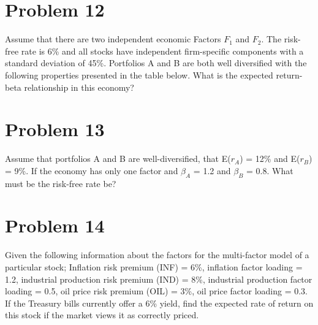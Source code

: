 \documentclass[12]{article}
\begin{document}
\color{black}
\section*{Problem 12}
Assume that there are two independent economic Factors $F_1$ and $F_2$. The risk-free rate is 6\% and all stocks have independent firm-specific components with a standard deviation of 45\%. Portfolios A and B are both well diversified with the following properties presented in the table below. What is the expected return-beta relationship in this economy?

\begin{table}[H]
\centering
{}
\end{table}




\color{black}
\section*{Problem 13}
Assume that portfolios A and B are well-diversified, that E($r_A$) = 12\% and E($r_B$) = 9\%. If the economy has only one factor and $\beta_A$ = 1.2 and $\beta_B$ = 0.8. What must be the risk-free rate be?



\color{black}
\section*{Problem 14}
Given the following information about the factors for the multi-factor model of a particular stock; Inflation risk premium (INF) = 6\%, inflation factor loading = 1.2, industrial production risk premium (IND) = 8\%, industrial production factor loading = 0.5, oil price risk premium (OIL) = 3\%, oil price factor loading = 0.3.
If the Treasury bills currently offer a 6\% yield, find the expected rate of return on this stock if the market views it as correctly priced.


\color{black}
\end{document}
